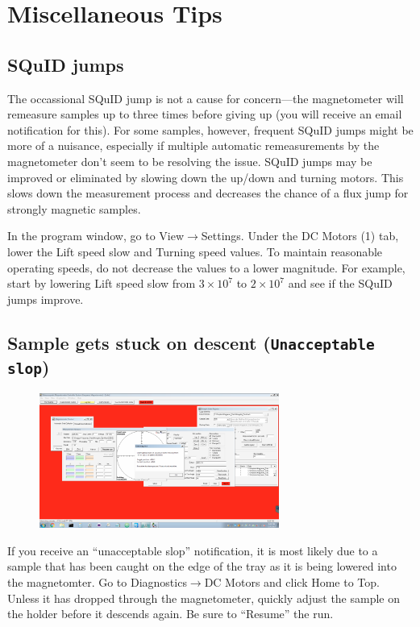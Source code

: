 \documentclass[11pt,letterpaper]{article}
\begin{document}
\newpage

\section*{Miscellaneous Tips}
\subsection*{SQuID jumps}
The occassional SQuID jump is not a cause for concern---the magnetometer will remeasure samples up to three times before giving up (you will receive an email notification for this). For some samples, however, frequent SQuID jumps might be more of a nuisance, especially if multiple automatic remeasurements by the magnetometer don't seem to be resolving the issue. SQuID jumps may be improved or eliminated by slowing down the up/down and turning motors. This slows down the measurement process and decreases the chance of a flux jump for strongly magnetic samples.

In the program window, go to \textsf{View}$\rightarrow$\textsf{Settings}. Under the \textsf{DC Motors (1)} tab, lower the \textsf{Lift speed slow} and \textsf{Turning speed} values. To maintain reasonable operating speeds, do not decrease the values to a lower magnitude. For example, start by lowering \textsf{Lift speed slow} from $3\times10^7$ to $2\times10^7$ and see if the SQuID jumps improve.

\subsection*{Sample gets stuck on descent (\texttt{Unacceptable slop})}

\begin{figure}[h]
\centering
\includegraphics[width=0.7\textwidth]{images/unacceptable_slop.png}
\end{figure}

If you receive an ``unacceptable slop'' notification, it is most likely due to a sample that has been caught on the edge of the tray as it is being lowered into the magnetomter. Go to \textsf{Diagnostics}$\rightarrow$\textsf{DC Motors} and click \textsf{Home to Top}. Unless it has dropped through the magnetometer, quickly adjust the sample on the holder before it descends again. Be sure to ``Resume'' the run.
\end{document}

